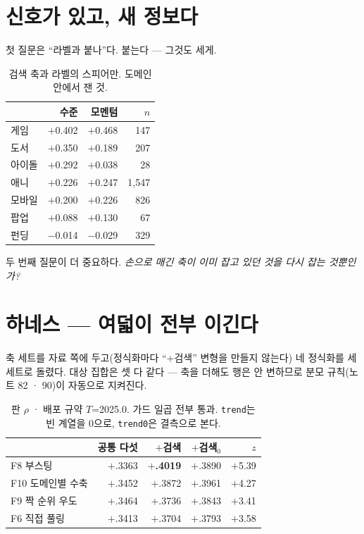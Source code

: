 \documentclass[10pt]{article}
\begin{document}
\section{신호가 있고, 새 정보다}

첫 질문은 ``라벨과 붙나''다. 붙는다 --- 그것도 세게.

\begin{table}[t]
\centering\tsize
\caption{검색 축과 라벨의 스피어만. 도메인 안에서 잰 것.}
\begin{tabular}{lrrr}
\toprule
& 수준 & 모멘텀 & $n$ \\
\midrule
게임 & $+$0.402 & $+$0.468 & 147 \\
도서 & $+$0.350 & $+$0.189 & 207 \\
아이돌 & $+$0.292 & $+$0.038 & 28 \\
애니 & $+$0.226 & $+$0.247 & 1{,}547 \\
모바일 & $+$0.200 & $+$0.226 & 826 \\
팝업 & $+$0.088 & $+$0.130 & 67 \\
펀딩 & $-$0.014 & $-$0.029 & 329 \\
\bottomrule
\end{tabular}
\end{table}

두 번째 질문이 더 중요하다. \emph{손으로 매긴 축이 이미 잡고 있던 것을
다시 잡는 것뿐인가?}


\section{하네스 --- 여덟이 전부 이긴다}

축 세트를 자료 쪽에 두고(정식화마다 ``+검색'' 변형을 만들지 않는다) 네
정식화를 세 세트로 돌렸다. 대상 집합은 셋 다 같다 --- 축을 더해도 행은
안 변하므로 분모 규칙(노트 82 · 90)이 자동으로 지켜진다.

\begin{table}[t]
\centering\tsize
\caption{판 $\rho$ · 배포 규약 $T$=2025.0. 가드 일곱 전부 통과.
\texttt{trend}는 빈 계열을 0으로, \texttt{trend0}은 결측으로 본다.}
\begin{tabular}{lrrrr}
\toprule
& 공통 다섯 & $+$검색 & $+$검색$_0$ & $z$ \\
\midrule
F8 부스팅 & $+$.3363 & \textbf{$+$.4019} & $+$.3890 & $+$5.39 \\
F10 도메인별 수축 & $+$.3452 & $+$.3872 & $+$.3961 & $+$4.27 \\
F9 짝 순위 우도 & $+$.3464 & $+$.3736 & $+$.3843 & $+$3.41 \\
F6 직접 풀링 & $+$.3413 & $+$.3704 & $+$.3793 & $+$3.58 \\
\bottomrule
\end{tabular}
\end{table}
\end{document}
